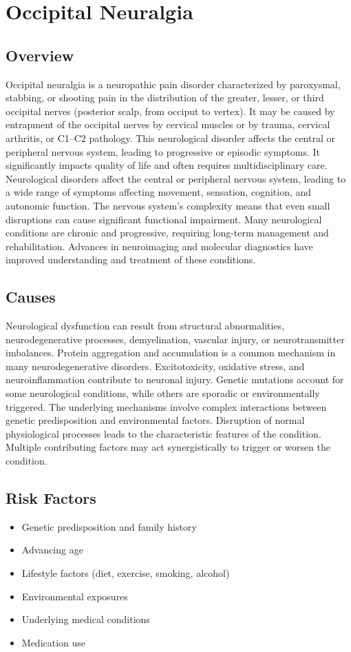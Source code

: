 \chapter{Occipital Neuralgia}
\label{sec:Occipital Neuralgia}

\section{Overview}
Occipital neuralgia is a neuropathic pain disorder characterized by paroxysmal, stabbing, or shooting pain in the distribution of the greater, lesser, or third occipital nerves (posterior scalp, from occiput to vertex). It may be caused by entrapment of the occipital nerves by cervical muscles or by trauma, cervical arthritis, or C1--C2 pathology. This neurological disorder affects the central or peripheral nervous system, leading to progressive or episodic symptoms. It significantly impacts quality of life and often requires multidisciplinary care. Neurological disorders affect the central or peripheral nervous system, leading to a wide range of symptoms affecting movement, sensation, cognition, and autonomic function. The nervous system's complexity means that even small disruptions can cause significant functional impairment. Many neurological conditions are chronic and progressive, requiring long-term management and rehabilitation. Advances in neuroimaging and molecular diagnostics have improved understanding and treatment of these conditions.
\section{Causes}
Neurological dysfunction can result from structural abnormalities, neurodegenerative processes, demyelination, vascular injury, or neurotransmitter imbalances. Protein aggregation and accumulation is a common mechanism in many neurodegenerative disorders. Excitotoxicity, oxidative stress, and neuroinflammation contribute to neuronal injury. Genetic mutations account for some neurological conditions, while others are sporadic or environmentally triggered. The underlying mechanisms involve complex interactions between genetic predisposition and environmental factors. Disruption of normal physiological processes leads to the characteristic features of the condition. Multiple contributing factors may act synergistically to trigger or worsen the condition.
\section{Risk Factors}
\begin{itemize}[noitemsep]
  \item Genetic predisposition and family history
  \item Advancing age
  \item Lifestyle factors (diet, exercise, smoking, alcohol)
  \item Environmental exposures
  \item Underlying medical conditions
  \item Medication use
\end{itemize}
